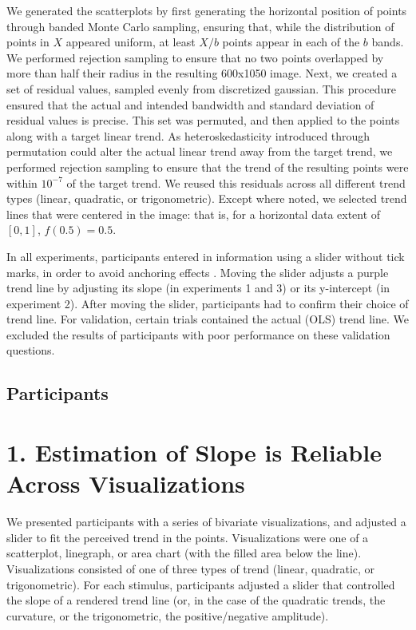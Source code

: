 \documentclass[chi_draft]{sigchi}
\begin{document}
We generated the scatterplots by first generating the horizontal position of points through banded Monte Carlo sampling, ensuring that, while the distribution of points in $X$ appeared uniform, at least $X/b$ points appear in each of the $b$ bands. We performed rejection sampling to ensure that no two points overlapped by more than half their radius in the resulting 600x1050 image. Next, we created a set of residual values, sampled evenly from discretized gaussian. This procedure ensured that the actual and intended bandwidth and standard deviation of residual values is precise. This set was permuted, and then applied to the points along with a target linear trend. As heteroskedasticity introduced through permutation could alter the actual linear trend away from the target trend, we performed rejection sampling to ensure that the trend of the resulting points were within $10^{-7}$ of the target trend. We reused this residuals across all different trend types (linear, quadratic, or trigonometric). Except where noted, we selected trend lines that were centered in the image: that is, for a horizontal data extent of $[0,1]$, $f(0.5) = 0.5$.


In all experiments, participants entered in information using a slider without tick marks, in order to avoid anchoring effects \cite{matejka2016effect}. Moving the slider adjusts a purple trend line by adjusting its slope (in experiments 1 and 3) or its y-intercept (in experiment 2). After moving the slider, participants had to confirm their choice of trend line. For validation, certain trials contained the actual (OLS) trend line. We excluded the results of participants with poor performance on these validation questions. 

\subsection{Participants}


\section{1. Estimation of Slope is Reliable \\ Across Visualizations}


We presented participants with a series of bivariate visualizations, and adjusted a slider to fit the perceived trend in the points. Visualizations were one of a scatterplot, linegraph, or area chart (with the filled area below the line). Visualizations consisted of one of three types of trend (linear, quadratic, or trigonometric). For each stimulus, participants adjusted a slider that controlled the slope of a rendered trend line (or, in the case of the quadratic trends, the curvature, or the trigonometric, the positive/negative amplitude).
\end{document}
